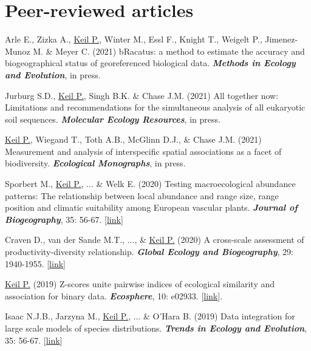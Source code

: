 \HRule


\section{Peer-reviewed articles}

\begin{etaremune}

\item Arle E., Zizka A., \underline{Keil P.}, Winter M., Essl F., Knight T., Weigelt P., Jimenez-Munoz M. \& Meyer C. (2021) bRacatus: a method to estimate the accuracy and biogeographical status of georeferenced biological data. \textit{\textbf{Methods in Ecology and Evolution}}, in press.

\item Jurburg S.D., \underline{Keil P.}, Singh B.K. \& Chase J.M. (2021) All together now: Limitations and recommendations for the simultaneous analysis of all eukaryotic soil sequences. \textit{\textbf{Molecular Ecology Resources}}, in press.

\item \underline{Keil P.}, Wiegand T., Toth A.B., McGlinn D.J.,  \& Chase J.M. (2021) Measurement and analysis of interspecific spatial associations as a facet of biodiversity. \textit{\textbf{Ecological Monographs}}, in press.

\item Sporbert M., \underline{Keil P.}, ... \& Welk E. (2020) Testing macroecological abundance patterns: The relationship between local abundance and range size, range position and climatic suitability among European vascular plants. \textit{\textbf{Journal of Biogeography}}, 35: 56-67. [\href{https://onlinelibrary.wiley.com/doi/full/10.1111/jbi.13926}{link}]

\item Craven D., van der Sande M.T., ..., \& \underline{Keil P.} (2020) A cross-scale assessment of productivity-diversity relationship. \textit{\textbf{Global Ecology and Biogeography}}, 29: 1940-1955. [\href{https://onlinelibrary.wiley.com/doi/full/10.1111/geb.13165}{link}]

\item \underline{Keil P.} (2019) Z-scores unite pairwise indices of ecological similarity and association for binary data. \textit{\textbf{Ecosphere}}, 10: e02933. [\href{https://esajournals.onlinelibrary.wiley.com/doi/full/10.1002/ecs2.2933}{link}].

\item Isaac N.J.B., Jarzyna M., \underline{Keil P.}, ... \& O'Hara B. (2019) Data integration for large scale models of species distributions. \textit{\textbf{Trends in Ecology and Evolution}}, 35: 56-67. [\href{https://www.cell.com/trends/ecology-evolution/fulltext/S0169-5347(19)30255-1?_returnURL=https%3A%2F%2Flinkinghub.elsevier.com%2Fretrieve%2Fpii%2FS0169534719302551%3Fshowall%3Dtrue}{link}]


\end{etaremune}
